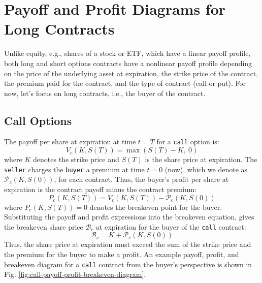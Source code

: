 \documentclass[11pt]{article}
\theoremstyle{definition}
\begin{document}
\section*{Payoff and Profit Diagrams for Long Contracts}
Unlike equity, e.g., shares of a stock or ETF, which have a linear payoff profile, both long and short options contracts have a nonlinear payoff profile depending on the price of the underlying asset at expiration, 
the strike price of the contract, the premium paid for the contract, and the type of contract (call or put).
For now, let's focus on long contracts, i.e., the buyer of the contract.

\subsection*{Call Options}
The payoff per share at expiration at time $t = T$ for a \texttt{call} option is:
\begin{equation}
V_{c}(K,S(T)) = \max\left(S(T) - K,~0\right)
\end{equation}
where $K$ denotes the strike price and $S(T)$ is the share price at expiration. 
The \texttt{seller} charges the \texttt{buyer} a premium at time $t=0$ (now), which we denote as $\mathcal{P}_{c}(K,S(0))$, for each contract.
Thus, the buyer's profit per share at expiration is the contract payoff minus the contract premium:
\begin{equation}
P_{c}(K,S(T)) = V_{c}(K,S(T)) -  \mathcal{P}_{c}(K,S(0))
\end{equation}
where $P_{c}(K,S(T)) = 0$ denotes the breakeven point for the buyer. 
Substituting the payoff and profit expressions into the breakeven equation, 
gives the breakeven share price $\mathcal{B}_{c}$ at expiration for the buyer 
of the \texttt{call} contract:
\begin{equation}
\mathcal{B}_{c} = K + \mathcal{P}_{c}(K,S(0))
\end{equation}
Thus, the share price at expiration must exceed the sum of the strike price and the premium for the buyer to make a profit.
An example payoff, profit, and breakeven diagram for a \texttt{call} contract from the buyer's perspective 
is shown in Fig. \ref{fig:call-payoff-profit-breakeven-diagram}.  
\end{document}
